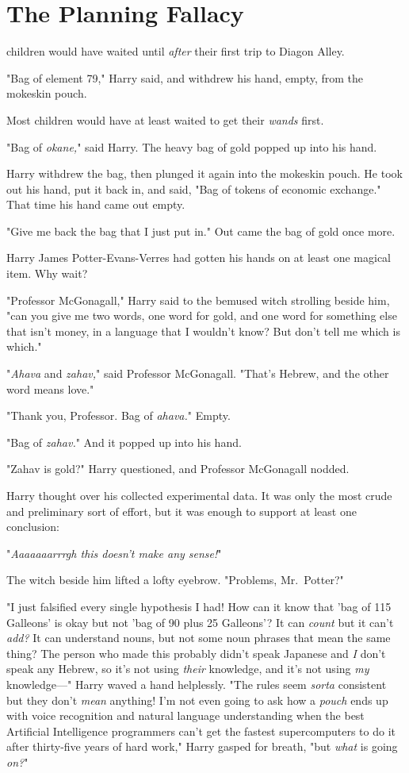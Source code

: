 \chapter{The Planning Fallacy}

 children would have waited until \emph{after} their first trip to 
Diagon Alley.

"Bag of element 79," Harry said, and withdrew his hand, empty, from the 
mokeskin pouch.

Most children would have at least waited to get their \emph{wands} first.

"Bag of \emph{okane,}" said Harry. The heavy bag of gold popped up into his 
hand.

Harry withdrew the bag, then plunged it again into the mokeskin pouch. He took 
out his hand, put it back in, and said, "Bag of tokens of economic exchange." 
That time his hand came out empty.

"Give me back the bag that I just put in." Out came the bag of gold once more.

Harry James Potter-Evans-Verres had gotten his hands on at least one magical 
item. Why wait?

"Professor McGonagall," Harry said to the bemused witch strolling beside him, 
"can you give me two words, one word for gold, and one word for something else 
that isn't money, in a language that I wouldn't know? But don't tell me which 
is which."

"\emph{Ahava} and \emph{zahav,}" said Professor McGonagall. "That's Hebrew, and 
the other word means love."

"Thank you, Professor. Bag of \emph{ahava.}" Empty.

"Bag of \emph{zahav.}" And it popped up into his hand.

"Zahav is gold?" Harry questioned, and Professor McGonagall nodded.

Harry thought over his collected experimental data. It was only the most crude 
and preliminary sort of effort, but it was enough to support at least one 
conclusion:

"\emph{Aaaaaaarrrgh this doesn't make any sense!}"

The witch beside him lifted a lofty eyebrow. "Problems, Mr.~Potter?"

"I just falsified every single hypothesis I had! How can it know that 'bag of 
115 Galleons' is okay but not 'bag of 90 plus 25 Galleons'? It can \emph{count} 
but it can't \emph{add?} It can understand nouns, but not some noun phrases 
that mean the same thing? The person who made this probably didn't speak 
Japanese and \emph{I} don't speak any Hebrew, so it's not using \emph{their} 
knowledge, and it's not using \emph{my} knowledge---" Harry waved a hand 
helplessly. "The rules seem \emph{sorta} consistent but they don't \emph{mean} 
anything! I'm not even going to ask how a \emph{pouch} ends up with voice 
recognition and natural language understanding when the best Artificial 
Intelligence programmers can't get the fastest supercomputers to do it after 
thirty-five years of hard work," Harry gasped for breath, "but \emph{what} is 
going \emph{on?}"


